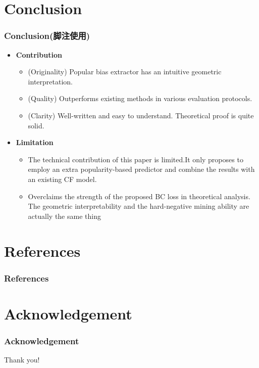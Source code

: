 \documentclass[aspectratio=169]{beamer}%
\begin{document}
{%
 \section{Conclusion}  
    \begin{frame}
        \frametitle{Conclusion(脚注使用)}
        \begin{itemize}
            \item
            \textbf{Contribution}\\
            \begin{itemize}
                \item
                (Originality) Popular bias extractor has an intuitive geometric interpretation.
                \item
                (Quality) Outperforms existing methods in various evaluation protocols.
                \item
                (Clarity) Well-written and easy to understand. Theoretical proof is quite solid.
            \end{itemize}
            \item
            \textbf{Limitation}\\
            \begin{itemize}
                \item
                The technical contribution of this paper is limited.It only proposes to employ an extra popularity-based predictor and combine the results with an existing CF model.
                \item
                Overclaims the strength of the proposed BC loss in theoretical analysis. The geometric interpretability and the hard-negative mining ability are actually the same thing\parencite{ pmlr-v119-wang20k, yuan2021one}
            \end{itemize}
        \end{itemize}
    \end{frame}

\section*{References}
	\begin{frame}[allowframebreaks]
	\frametitle{References}\color{NJUPurple}{
        \printbibliography[heading=none]}
	\end{frame}

\section*{Acknowledgement}  
    \begin{frame}
        \frametitle{Acknowledgement}
        \textcolor{NJUPurple}{\Huge{\centerline{Thank you!}}}
    \end{frame}
}
\end{document}
